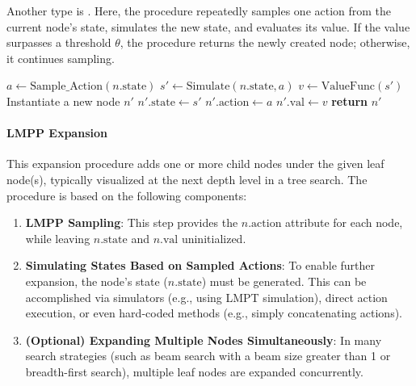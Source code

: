 Another type is .
Here, the procedure repeatedly samples one action from the current node’s state, simulates the new state, and evaluates its value. If the value surpasses a threshold $\theta$, the procedure returns the newly created node; otherwise, it continues sampling.

\begin{procedure}[h!]
\caption{Value-Based Threshold Selection}
\label{proc:threshold_val_selection}
\small
\begin{algorithmic}[1]
            \State $a \gets \text{Sample\_Action}(n.\text{state})$
            \State $s' \gets \text{Simulate}(n.\text{state}, a)$
            \State $v \gets \text{ValueFunc}(s')$
                \State Instantiate a new node $n'$
                \State $n'.\text{state} \gets s'$
                \State $n'.\text{action} \gets a$
                \State $n'.\text{val} \gets v$
                \State \textbf{return} $n'$
            \EndIf
        \EndWhile
    \EndProcedure
\end{algorithmic}
\end{procedure}

\paragraph{LMPP Expansion}  
This expansion procedure adds one or more child nodes under the given leaf node(s), typically visualized at the next depth level in a tree search. The procedure is based on the following components:
\begin{enumerate}
    \item \textbf{LMPP Sampling}:  
    This step provides the $n.\text{action}$ attribute for each node, while leaving $n.\text{state}$ and $n.\text{val}$ uninitialized.
    
    \item \textbf{Simulating States Based on Sampled Actions}:  
    To enable further expansion, the node’s state ($n.\text{state}$) must be generated. This can be accomplished via simulators (e.g., using LMPT simulation), direct action execution, or even hard-coded methods (e.g., simply concatenating actions).
    
    \item \textbf{(Optional) Expanding Multiple Nodes Simultaneously}:  
    In many search strategies (such as beam search with a beam size greater than 1 or breadth-first search), multiple leaf nodes are expanded concurrently.
\end{enumerate}

